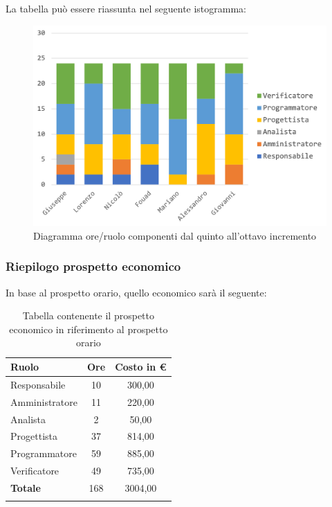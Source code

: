 	La tabella può essere riassunta nel seguente istogramma:
	\begin{figure}[H]
		\centering
		\includegraphics[width=0.8\linewidth]{./images/preventivo/incremento5-8-1.png}
		\caption{Diagramma ore/ruolo componenti dal quinto all'ottavo incremento}
		\label{fig:diagramma suddivione ruoli incrementi V-VIII}
	\end{figure}
	\pagebreak
	
	\subsubsection{Riepilogo prospetto economico}
	In base al prospetto orario, quello economico sarà il seguente: 
	
	\begin{longtable}{|l|c|c|}
		\hline
		\rowcolor{lighter-grayer}
		\textbf{Ruolo} & \textbf{Ore} & \textbf{Costo in € } \\
		\hline
		\endfirsthead
		
		\hline
		Responsabile 	    & 10 & 300,00\\
		\hline 
		\hline
		Amministratore	   & 11 & 220,00\\
		\hline
		\hline
		Analista 				& 2 & 50,00\\
		\hline
		\hline
		Progettista 		   & 37 & 814,00\\
		\hline
		\hline
		Programmatore 	  & 59 & 885,00\\
		\hline
		\hline
		Verificatore 		   & 49 & 735,00\\
		\hline
		\textbf{Totale} 	 & 168 & 3004,00\\
		\hline
		\caption{Tabella contenente il prospetto economico in riferimento al prospetto orario}
	\end{longtable}
	
